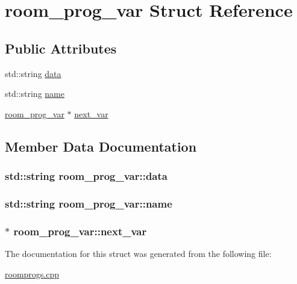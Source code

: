 \hypertarget{structroom__prog__var}{\section{room\-\_\-prog\-\_\-var Struct Reference}
\label{structroom__prog__var}
}
\subsection*{Public Attributes}
\begin{DoxyCompactItemize}
\item 
std\-::string \hyperlink{structroom__prog__var_a608f7428fe55505c06a56496f6a1750b}{data}
\item 
std\-::string \hyperlink{structroom__prog__var_ae7d312fa45f62260d6b51ae2254df7c9}{name}
\item 
\hyperlink{structroom__prog__var}{room\-\_\-prog\-\_\-var} $\ast$ \hyperlink{structroom__prog__var_a6f0fecf23cadd63acf23d280a7d692ee}{next\-\_\-var}
\end{DoxyCompactItemize}


\subsection{Member Data Documentation}
\hypertarget{structroom__prog__var_a608f7428fe55505c06a56496f6a1750b}{
\subsubsection[{data}]{\setlength{\rightskip}{0pt plus 5cm}std\-::string room\-\_\-prog\-\_\-var\-::data}}\label{structroom__prog__var_a608f7428fe55505c06a56496f6a1750b}
\hypertarget{structroom__prog__var_ae7d312fa45f62260d6b51ae2254df7c9}{
\subsubsection[{name}]{\setlength{\rightskip}{0pt plus 5cm}std\-::string room\-\_\-prog\-\_\-var\-::name}}\label{structroom__prog__var_ae7d312fa45f62260d6b51ae2254df7c9}
\hypertarget{structroom__prog__var_a6f0fecf23cadd63acf23d280a7d692ee}{
\subsubsection[{next\-\_\-var}]{$\ast$ room\-\_\-prog\-\_\-var\-::next\-\_\-var}}\label{structroom__prog__var_a6f0fecf23cadd63acf23d280a7d692ee}


The documentation for this struct was generated from the following file\-:\begin{DoxyCompactItemize}
\item 
\hyperlink{roomprogs_8cpp}{roomprogs.\-cpp}\end{DoxyCompactItemize}
